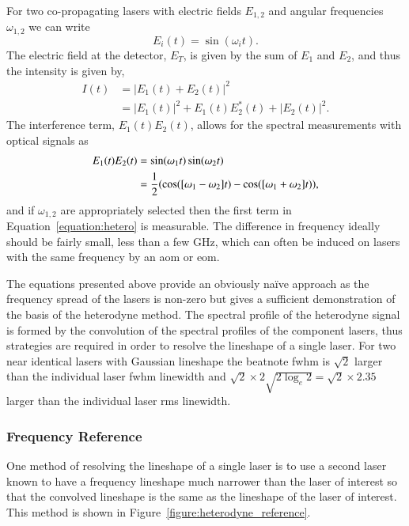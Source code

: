 For two co-propagating lasers with electric fields $E_{1, 2}$ and angular frequencies $\omega_{1, 2}$ we can write
\begin{equation}
E_{i}(t) = \sin(\omega_{i}t).
\end{equation}
The electric field at the detector, $E_T$, is given by the sum of $E_{1}$ and $E_{2}$, and thus the intensity is given by,
\begin{align}
I(t) &= |E_1(t) + E_2(t)|^2\nonumber\\
&= |E_1(t)|^2 + E_1(t)E_2^*(t) + |E_2(t)|^2.
\end{align}
The interference term, $E_1(t)E_2(t)$, allows for the spectral measurements with optical signals as
\begin{align}
E_1(t)E_2(t) &= \sin(\omega_1 t) \sin(\omega_2 t) \notag \\
&= \frac{1}{2} (\cos([\omega_1-\omega_2]t) - \cos([\omega_1+\omega_2]t)), \label{equation:hetero}
\end{align}
and if $\omega_{1,2}$ are appropriately selected then the first term in Equation~\ref{equation:hetero} is measurable.
The difference in frequency ideally should be fairly small, less than a few GHz, which can often be induced on lasers with the same frequency by an \gls{aom} or \gls{eom}.

The equations presented above provide an obviously na\"ive approach as the frequency spread of the lasers is non-zero but gives a sufficient demonstration of the basis of the heterodyne method.
The spectral profile of the heterodyne signal is formed by the convolution of the spectral profiles of the component lasers, thus strategies are required in order to resolve the lineshape of a single laser.
For two near identical lasers with Gaussian lineshape the beatnote \gls{fwhm} is $\sqrt{2}$ larger than the individual laser \gls{fwhm} linewidth and $\sqrt{2}\times2\sqrt{2\log_e2}=\sqrt{2}\times2.35$ larger than the individual laser \gls{rms} linewidth.

\subsubsection{Frequency Reference}
One method of resolving the lineshape of a single laser is to use a second laser known to have a frequency lineshape much narrower than the laser of interest so that the convolved lineshape is the same as the lineshape of the laser of interest.
This method is shown in Figure~\ref{figure:heterodyne_reference}.


